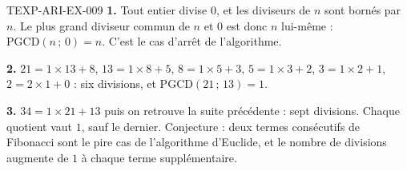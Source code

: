 % 
% 
\begin{corrige}{TEXP-ARI-EX-009}
\textbf{1.} Tout entier divise $0$, et les diviseurs de $n$ sont bornés par
$n$. Le plus grand diviseur commun de $n$ et $0$ est donc $n$ lui-même :
$\mathrm{PGCD}(n\,;\,0)=n$. C'est le cas d'arrêt de l'algorithme.

\textbf{2.} $21=1\times13+8$, $13=1\times8+5$, $8=1\times5+3$, $5=1\times3+2$,
$3=1\times2+1$, $2=2\times1+0$ : six divisions, et
$\mathrm{PGCD}(21\,;\,13)=1$.

\textbf{3.} $34=1\times21+13$ puis on retrouve la suite précédente : sept
divisions. Chaque quotient vaut $1$, sauf le dernier. Conjecture : deux termes
consécutifs de Fibonacci sont le pire cas de l'algorithme d'Euclide, et le
nombre de divisions augmente de $1$ à chaque terme supplémentaire.
\end{corrige}
